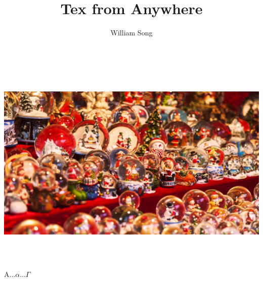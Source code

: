 \documentclass{article}            %
\author{William Song}
\title{Tex from Anywhere}
\begin{document}
	\begin{center}
	\includegraphics*[width=7.00in,height=4.00in]{1,eps.jpg}
	\end{center}

\textcolor{my_light-blue}{A...\(\alpha\)...$\Gamma$} 
\\
\end{document}

